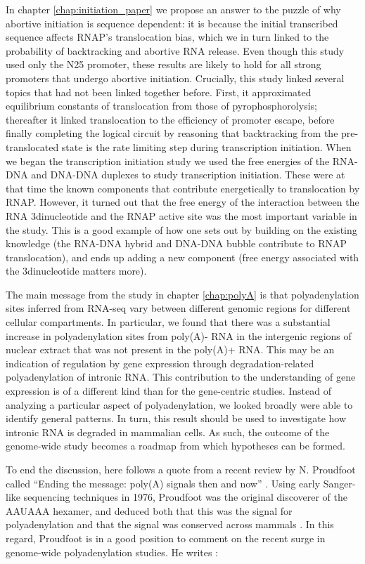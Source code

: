 In chapter \ref{chap:initiation_paper} we propose an answer to the puzzle of
why abortive initiation is sequence dependent: it is because the initial
transcribed sequence affects RNAP's translocation bias, which we in turn
linked to the probability of backtracking and abortive RNA release. Even
though this study used only the N25 promoter, these results are likely to hold
for all strong promoters that undergo abortive initiation. Crucially, this
study linked several topics that had not been linked together before. First,
it approximated equilibrium constants of translocation from those of
pyrophosphorolysis; thereafter it linked translocation to the efficiency of
promoter escape, before finally completing the logical circuit by reasoning
that backtracking from the pre-translocated state is the rate limiting step
during transcription initiation. When we began the transcription initiation
study we used the free energies of the RNA-DNA and DNA-DNA duplexes to study
transcription initiation.  These were at that time the known components that
contribute energetically to translocation by RNAP. However, it turned out that
the free energy of the interaction between the RNA 3\ppp dinucleotide and the
RNAP active site was the most important variable in the study. This is a good
example of how one sets out by building on the existing knowledge (the RNA-DNA
hybrid and DNA-DNA bubble contribute to RNAP translocation), and ends up
adding a new component (free energy associated with the 3\ppp dinucleotide
matters more).

The main message from the study in chapter \ref{chap:polyA} is that
polyadenylation sites inferred from RNA-seq vary between different genomic
regions for different cellular compartments. In particular, we found that there
was a substantial increase in polyadenylation sites from poly(A)- RNA in the
intergenic regions of nuclear extract that was not present in the poly(A)+ RNA.
This may be an indication of regulation by gene expression through
degradation-related polyadenylation of intronic RNA. This contribution to the
understanding of gene expression is of a different kind than for the
gene-centric studies. Instead of analyzing a particular aspect of
polyadenylation, we looked broadly were able to identify general patterns. In
turn, this result should be used to investigate how intronic RNA is degraded in
mammalian cells. As such, the outcome of the genome-wide study becomes a
roadmap from which hypotheses can be formed.

To end the discussion, here follows a quote from a recent review by N.
Proudfoot called ``Ending the message: poly(A) signals then and now''
\cite{proudfoot_ending_2011}. Using early Sanger-like sequencing techniques in
1976, Proudfoot was the original discoverer of the AAUAAA hexamer, and deduced
both that this was the signal for polyadenylation and that the signal was
conserved across mammals \cite{proudfoot_3_1976}. In this regard, Proudfoot is
in a good position to comment on the recent surge in genome-wide
polyadenylation studies. He writes \cite{proudfoot_ending_2011}:

